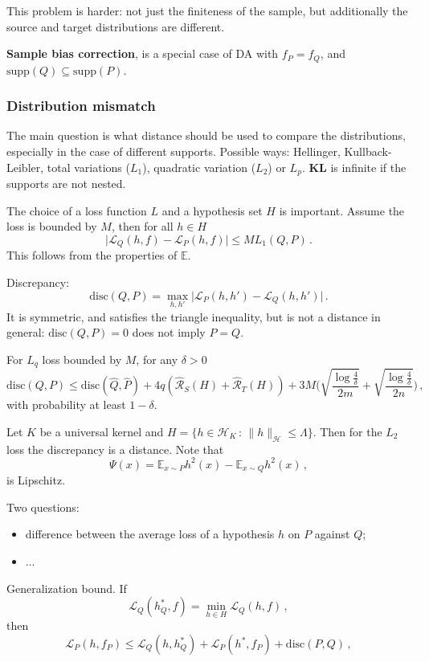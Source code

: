 \documentclass[a4paper]{article}
\newcommand{\ex}{\mathbb{E}}
\newcommand{\Hcal}{\mathcal{H}}
\begin{document}
This problem is harder: not just the finiteness of the sample, but additionally
the source and target distributions are different.

\textbf{Sample bias correction}, is a special case of DA with $f_P = f_Q$, and
$\text{supp}(Q)\subseteq \text{supp}(P)$.

\subsubsection{Distribution mismatch} %
\label{ssub:distribution_mismatch}

The main question is what distance should be used to compare the distributions,
especially in the case of different supports. Possible ways: Hellinger, Kullback-
Leibler, total variations ($L_1$), quadratic variation ($L_2$) or $L_p$.
\textbf{KL} is infinite if the supports are not nested.

The choice of a loss function $L$ and a hypothesis set $H$ is important.
Assume the loss is bounded by $M$, then for all $h\in H$
\[ \bigl| \mathcal{L}_Q(h, f) - \mathcal{L}_P(h, f) \bigr|
    \leq M L_1(Q, P)
    \,.\]
This follows from the properties of $\ex$.

Discrepancy:
\[ \text{disc}(Q,P) = \max_{h,h'} \bigl| \mathcal{L}_P(h,h') - \mathcal{L}_Q(h,h')\bigr| \,. \]
It is symmetric, and satisfies the triangle inequality, but is not a distance in
general: $\text{disc}(Q,P) = 0$ does not imply $P=Q$.

For $L_q$ loss bounded by $M$, for any $\delta>0$
\[ \text{disc}(Q,P)
    \leq \text{disc}(\hat{Q},\hat{P})
    + 4q(\hat{\mathcal{R}}_S(H) + \hat{\mathcal{R}}_T(H))
    + 3 M \biggl( \sqrt{\frac{\log\frac{4}{\delta}}{2m}}
                + \sqrt{\frac{\log\frac{4}{\delta}}{2n}} \biggr)
    \,,\]
with probability at least $1-\delta$.

Let $K$ be a universal kernel and $H = \{ h\in \Hcal_K\,:\,\|h\|_\Hcal\leq \Lambda \}$.
Then for the $L_2$ loss the discrepancy is a distance. Note that 
\[ \Psi(x) = \ex_{x\sim P} h^2(x) - \ex_{x\sim Q} h^2(x) \,, \]
is Lipschitz.

Two questions: \begin{itemize}
    \item difference between the average loss of a hypothesis $h$ on $P$ against $Q$;
    \item ...
\end{itemize}
Generalization bound. If
\[ \mathcal{L}_Q(h^*_Q, f) = \min_{h\in H} \mathcal{L}_Q(h, f) \,,\]
then
\[ \mathcal{L}_P(h, f_P)
    \leq \mathcal{L}_Q(h, h^*_Q)
    + \mathcal{L}_P(h^*, f_P)
    + \text{disc}(P,Q)
    \,, \]
\end{document}
